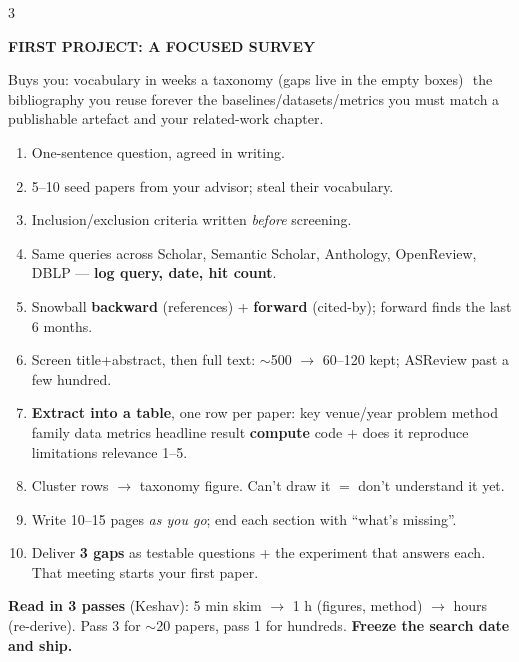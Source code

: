 \documentclass[10pt,a4paper]{article}
\newcommand{\head}[1]{%
  \vspace{4.5pt}{\color{brand}\rule{\linewidth}{0.9pt}}\par\vspace{1.5pt}%
  {\bfseries\color{brand}\MakeUppercase{#1}}\par\vspace{2pt}}
\newcommand{\dt}{\,\textperiodcentered\,\allowbreak}
\newenvironment{flag}
 {\par\addvspace{2pt}\setlength{\FrameSep}{3pt}%
  \def\FrameCommand{{\color{accent}\vrule width 1.4pt}\hspace{4pt}}%
  \MakeFramed{\advance\hsize-\width \FrameRestore}\parindent=0pt\ignorespaces}
 {\par\endMakeFramed\addvspace{2pt}}
\begin{document}
\begin{multicols}{3}
\head{First project: a focused survey}
Buys you: vocabulary in weeks\dt a taxonomy (gaps live in the empty boxes)\dt
the bibliography you reuse forever\dt the baselines/datasets/metrics you must
match\dt a publishable artefact and your related-work chapter.
\begin{enumerate}
  \item One-sentence question, agreed in writing.
  \item 5--10 seed papers from your advisor; steal their vocabulary.
  \item Inclusion/exclusion criteria written \emph{before} screening.
  \item Same queries across Scholar, Semantic Scholar, Anthology, OpenReview,
        DBLP --- \textbf{log query, date, hit count}.
  \item Snowball \textbf{backward} (references) + \textbf{forward} (cited-by);
        forward finds the last 6 months.
  \item Screen title+abstract, then full text: $\sim$500 $\to$ 60--120 kept;
        ASReview past a few hundred.
  \item \textbf{Extract into a table}, one row per paper: key \textbar{}
        venue/year \textbar{} problem \textbar{} method family \textbar{} data
        \textbar{} metrics \textbar{} headline result \textbar{}
        \textbf{compute} \textbar{} code + does it reproduce \textbar{}
        limitations \textbar{} relevance 1--5.
  \item Cluster rows $\to$ taxonomy figure. Can't draw it $=$ don't understand
        it yet.
  \item Write 10--15 pages \emph{as you go}; end each section with ``what's
        missing''.
  \item Deliver \textbf{3 gaps} as testable questions + the experiment that
        answers each. That meeting starts your first paper.
\end{enumerate}
\begin{flag}
\textbf{Read in 3 passes} (Keshav): 5 min skim $\to$ 1 h (figures, method)
$\to$ hours (re-derive). Pass 3 for $\sim$20 papers, pass 1 for hundreds.
\textbf{Freeze the search date and ship.}
\end{flag}


\end{multicols}
\end{document}
